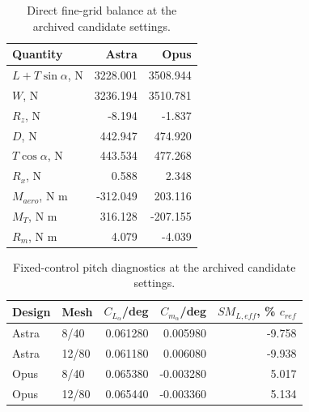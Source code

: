 \documentclass[11pt,a4paper]{article}
\begin{document}
\begin{table}[H]\centering\small
\caption{Direct fine-grid balance at the archived candidate settings.}\label{tab:residual}
\begin{tabular}{lrr}\toprule
Quantity & Astra & Opus\\\midrule
$L+T\sin\alpha$, N &3228.001&3508.944\\
$W$, N &3236.194&3510.781\\
$R_z$, N &-8.194&-1.837\\
$D$, N &442.947&474.920\\
$T\cos\alpha$, N &443.534&477.268\\
$R_x$, N &0.588&2.348\\
$M_{aero}$, N m &-312.049&203.116\\
$M_T$, N m &316.128&-207.155\\
$R_m$, N m &4.079&-4.039\\\bottomrule
\end{tabular}
\end{table}

\begin{table}[H]\centering\small
\caption{Fixed-control pitch diagnostics at the archived candidate settings.}\label{tab:stability}
\begin{tabular}{llrrr}\toprule
Design & Mesh & $C_{L_\alpha}$/deg & $C_{m_\alpha}$/deg & $SM_{L,eff}$, \% $c_{ref}$\\\midrule
Astra &8/40&0.061280&0.005980&-9.758\\
Astra &12/80&0.061180&0.006080&-9.938\\
Opus &8/40&0.065380&-0.003280&5.017\\
Opus &12/80&0.065440&-0.003360&5.134\\\bottomrule
\end{tabular}
\end{table}
\end{document}
